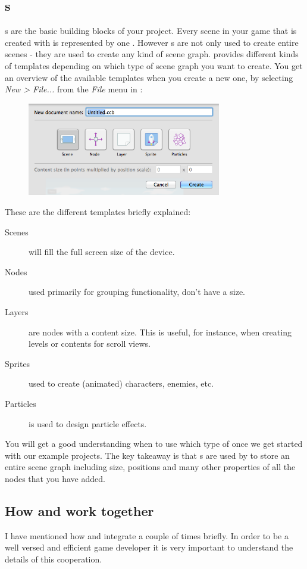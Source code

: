 \subsection{\ccbfile{}s}
\ccbfile{}s are the basic building blocks of your \SB{} project. Every scene in
your game that is created with \SB{} is represented by one \ccbfile{}. However
\ccbfile{}s are not only used to create entire scenes - they are used to create
any kind of scene graph. \SB{} provides different kinds of templates depending
on which type of scene graph you want to create. You get an overview of the
available \ccbfile{} templates when you create a new one, by selecting
\textit{New > File... } from the \textit{File} menu in \SB{}:
\begin{figure}[H]
		\centering
		\includegraphics[width=240pt]{images/spritebuilder/new-ccb.png}     
\end{figure} 
These are the different templates briefly explained:
\begin{description}
\item[Scenes] will fill the full screen size of the device.
\item[Nodes] used primarily for grouping functionality, don't have a size.
\item[Layers] are nodes with a content size. This is useful, for instance, when
creating levels or contents for scroll views.
\item[Sprites] used to create (animated) characters, enemies, etc.
\item[Particles] is used to design particle effects.
\end{description}
You will get a good understanding when to use which type of \ccbfile{} once we
get started with our example projects. The key takeaway is that \ccbfile{}s are
used by \SB{} to store an entire scene graph including size, positions and many
other properties of all the nodes that you have added.

\subsection{How \SB{} and \xcode{} work together}
\label{Publish}
I have mentioned how \SB{} and \xcode{} integrate a couple of times briefly. In
order to be a well versed and efficient \SB{} game developer it is very
important to understand the details of this cooperation.

